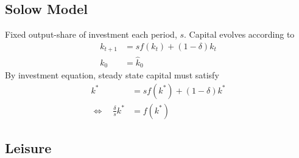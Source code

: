 \documentclass[12pt]{article}
\theoremstyle{plain}
\theoremstyle{definition}
\theoremstyle{remark}
\begin{document}
\subsection{Solow Model}

Fixed output-share of investment each period, $s$. Capital evolves
according to
\begin{align*}
  k_{t+1} &= sf(k_t) + (1-\delta)k_t \\
  k_0 &= \hat{k}_0
\end{align*}
By investment equation, steady state capital must satisfy
\begin{align*}
  k^* &= sf(k^*) + (1-\delta)k^*\\
  \Leftrightarrow\quad
  \frac{\delta}{s} k^* &= f(k^*)
\end{align*}


\clearpage
\subsection{Leisure}
\end{document}
